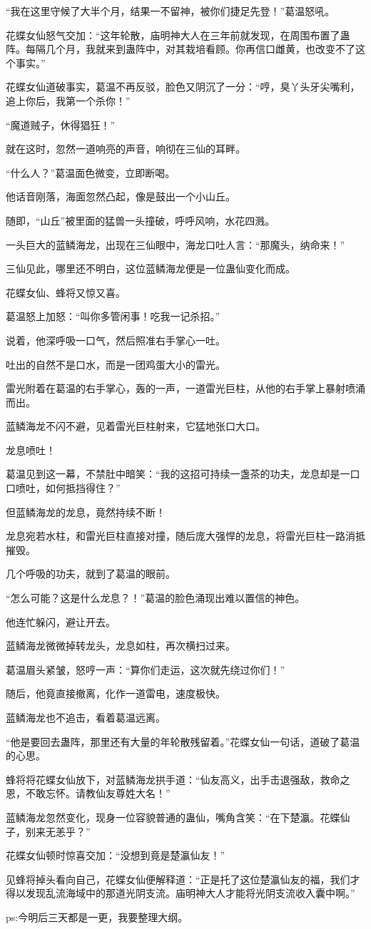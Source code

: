 \begin{this_body}
“我在这里守候了大半个月，结果一不留神，被你们捷足先登！”葛温怒吼。

花蝶女仙怒气交加：“这年轮散，庙明神大人在三年前就发现，在周围布置了蛊阵。每隔几个月，我就来到蛊阵中，对其栽培看顾。你再信口雌黄，也改变不了这个事实。”

花蝶女仙道破事实，葛温不再反驳，脸色又阴沉了一分：“哼，臭丫头牙尖嘴利，追上你后，我第一个杀你！”

“魔道贼子，休得猖狂！”

就在这时，忽然一道响亮的声音，响彻在三仙的耳畔。

“什么人？”葛温面色微变，立即断喝。

他话音刚落，海面忽然凸起，像是鼓出一个小山丘。

随即，“山丘”被里面的猛兽一头撞破，呼呼风响，水花四溅。

一头巨大的蓝鳞海龙，出现在三仙眼中，海龙口吐人言：“那魔头，纳命来！”

三仙见此，哪里还不明白，这位蓝鳞海龙便是一位蛊仙变化而成。

花蝶女仙、蜂将又惊又喜。

葛温怒上加怒：“叫你多管闲事！吃我一记杀招。”

说着，他深呼吸一口气，然后照准右手掌心一吐。

吐出的自然不是口水，而是一团鸡蛋大小的雷光。

雷光附着在葛温的右手掌心，轰的一声，一道雷光巨柱，从他的右手掌上暴射喷涌而出。

蓝鳞海龙不闪不避，见着雷光巨柱射来，它猛地张口大口。

龙息喷吐！

葛温见到这一幕，不禁肚中暗笑：“我的这招可持续一盏茶的功夫，龙息却是一口口喷吐，如何抵挡得住？”

但蓝鳞海龙的龙息，竟然持续不断！

龙息宛若水柱，和雷光巨柱直接对撞，随后庞大强悍的龙息，将雷光巨柱一路消抵摧毁。

几个呼吸的功夫，就到了葛温的眼前。

“怎么可能？这是什么龙息？！”葛温的脸色涌现出难以置信的神色。

他连忙躲闪，避让开去。

蓝鳞海龙微微掉转龙头，龙息如柱，再次横扫过来。

葛温眉头紧皱，怒哼一声：“算你们走运，这次就先绕过你们！”

随后，他竟直接撤离，化作一道雷电，速度极快。

蓝鳞海龙也不追击，看着葛温远离。

“他是要回去蛊阵，那里还有大量的年轮散残留着。”花蝶女仙一句话，道破了葛温的心思。

蜂将将花蝶女仙放下，对蓝鳞海龙拱手道：“仙友高义，出手击退强敌，救命之恩，不敢忘怀。请教仙友尊姓大名！”

蓝鳞海龙忽然变化，现身一位容貌普通的蛊仙，嘴角含笑：“在下楚瀛。花蝶仙子，别来无恙乎？”

花蝶女仙顿时惊喜交加：“没想到竟是楚瀛仙友！”

见蜂将掉头看向自己，花蝶女仙便解释道：“正是托了这位楚瀛仙友的福，我们才得以发现乱流海域中的那道光阴支流。庙明神大人才能将光阴支流收入囊中啊。”

ps:今明后三天都是一更，我要整理大纲。

\end{this_body}

